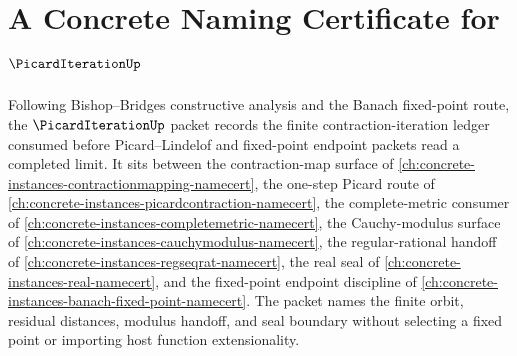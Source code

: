 \chapter{A Concrete Naming Certificate for $\PicardIterationUp$}
\label{ch:concrete-instances-picard-iteration-namecert}

Following Bishop--Bridges constructive analysis and the Banach fixed-point route, the $\PicardIterationUp$ packet records the finite contraction-iteration ledger consumed before Picard--Lindelof and fixed-point endpoint packets read a completed limit. It sits between the contraction-map surface of \autoref{ch:concrete-instances-contractionmapping-namecert}, the one-step Picard route of \autoref{ch:concrete-instances-picardcontraction-namecert}, the complete-metric consumer of \autoref{ch:concrete-instances-completemetric-namecert}, the Cauchy-modulus surface of \autoref{ch:concrete-instances-cauchymodulus-namecert}, the regular-rational handoff of \autoref{ch:concrete-instances-regseqrat-namecert}, the real seal of \autoref{ch:concrete-instances-real-namecert}, and the fixed-point endpoint discipline of \autoref{ch:concrete-instances-banach-fixed-point-namecert}. The packet names the finite orbit, residual distances, modulus handoff, and seal boundary without selecting a fixed point or importing host function extensionality.

